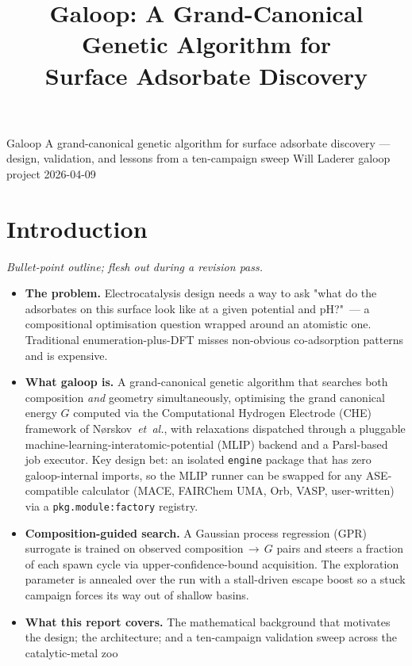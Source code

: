 \documentclass[11pt,letterpaper]{article}
\title{Galoop: A Grand-Canonical Genetic Algorithm for\\Surface Adsorbate Discovery}
\begin{document}
\makereporttitle
  {Galoop}
  {A grand-canonical genetic algorithm for surface adsorbate discovery — design, validation, and lessons from a ten-campaign sweep}
  {Will Laderer}
  {galoop project}
  {2026-04-09}

\tableofcontents
\vspace{1em}

\section{Introduction}
\label{sec:intro}

\emph{Bullet-point outline; flesh out during a revision pass.}

\begin{itemize}
  \item \textbf{The problem.} Electrocatalysis design needs a way to
    ask "what do the adsorbates on this surface look like at a given
    potential and pH?"~--- a compositional optimisation question
    wrapped around an atomistic one. Traditional enumeration-plus-DFT
    misses non-obvious co-adsorption patterns and is expensive.
  \item \textbf{What galoop is.} A grand-canonical genetic algorithm
    that searches both composition \emph{and} geometry simultaneously,
    optimising the grand canonical energy $G$ computed via the
    Computational Hydrogen Electrode (CHE) framework of
    N{\o}rskov~\emph{et~al.}, with relaxations dispatched through a
    pluggable machine-learning-interatomic-potential (MLIP) backend and
    a Parsl-based job executor. Key design bet: an isolated
    \texttt{engine} package that has zero galoop-internal imports, so
    the MLIP runner can be swapped for any ASE-compatible calculator
    (MACE, FAIRChem UMA, Orb, VASP, user-written) via a
    \texttt{pkg.module:factory} registry.
  \item \textbf{Composition-guided search.} A Gaussian process
    regression (GPR) surrogate is trained on observed
    composition$\,\to\,G$ pairs and steers a fraction of each spawn
    cycle via upper-confidence-bound acquisition. The exploration
    parameter is annealed over the run with a stall-driven escape
    boost so a stuck campaign forces its way out of shallow basins.
  \item \textbf{What this report covers.} The mathematical background
    that motivates the design; the architecture; and a ten-campaign
    validation sweep across the catalytic-metal zoo

\end{itemize}
\end{document}
